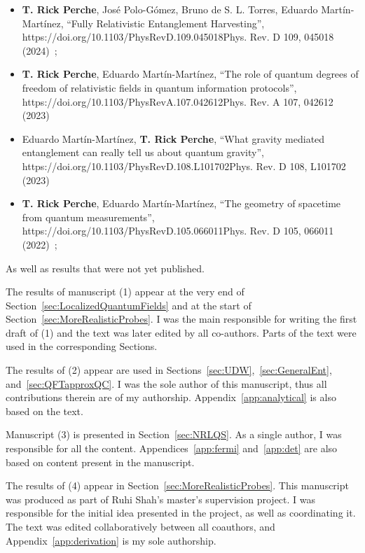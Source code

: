 \documentclass[letterpaper,12pt,titlepage,oneside,final]{book}
\newcommand{\href}[1]{#1} %
\begin{document}
\begin{itemize}
    \item[(7)] \textbf{T. Rick Perche}, José Polo-Gómez, Bruno de S. L. Torres, Eduardo Martín-Martínez, ``Fully Relativistic Entanglement Harvesting'', \href{https://doi.org/10.1103/PhysRevD.109.045018}{Phys. Rev. D 109, 045018 (2024)}~\cite{FullHarvesting};
    \item[(8)] \textbf{T. Rick Perche}, Eduardo Martín-Martínez, ``The role of quantum degrees of freedom of relativistic fields in quantum information protocols'', \href{https://doi.org/10.1103/PhysRevA.107.042612}{Phys. Rev. A 107, 042612 (2023)}~\cite{quantClass}
    \item[(9)] Eduardo Martín-Martínez, \textbf{T. Rick Perche}, ``What gravity mediated entanglement can really tell us about quantum gravity'', \href{https://doi.org/10.1103/PhysRevD.108.L101702}{Phys. Rev. D 108, L101702 (2023)}~\cite{ourBMV}
    \item[(10)] \textbf{T. Rick Perche}, Eduardo Martín-Martínez, ``The geometry of spacetime from quantum measurements'', \href{https://doi.org/10.1103/PhysRevD.105.066011}{Phys. Rev. D 105, 066011 (2022)}~\cite{geometry};
\end{itemize}
\noindent As well as results that were not yet published.

The results of manuscript (1) appear at the very end of Section~\ref{sec:LocalizedQuantumFields} and at the start of Section~\ref{sec:MoreRealisticProbes}. I was the main responsible for writing the first draft of (1) and the text was later edited by all co-authors. Parts of the text were used in the corresponding Sections.

The results of (2) appear are used in Sections~\ref{sec:UDW},~\ref{sec:GeneralEnt}, and~\ref{sec:QFTapproxQC}. I was the sole author of this manuscript, thus all contributions therein are of my authorship. Appendix~\ref{app:analytical} is also based on the text.

Manuscript (3) is presented in Section~\ref{sec:NRLQS}. As a single author, I was responsible for all the content. Appendices~\ref{app:fermi} and~\ref{app:det} are also based on content present in the manuscript.

The results of (4) appear in Section~\ref{sec:MoreRealisticProbes}. This manuscript was produced as part of Ruhi Shah's master's supervision project. I was responsible for the initial idea presented in the project, as well as coordinating it. The text was edited collaboratively between all coauthors, and Appendix~\ref{app:derivation} is my sole authorship.
\end{document}
